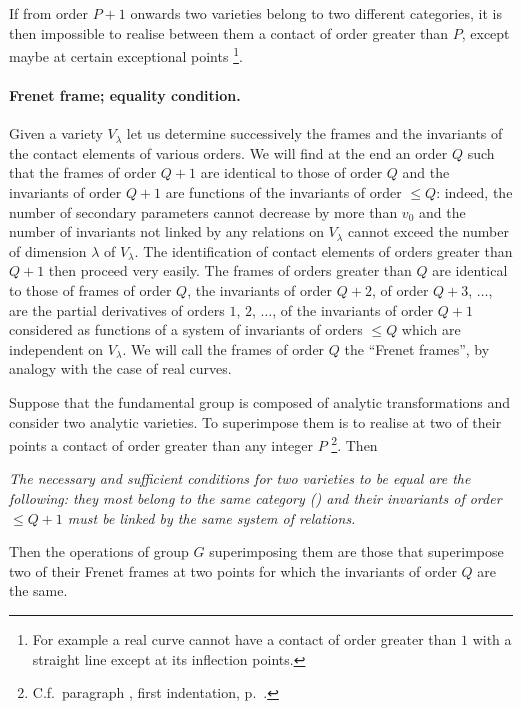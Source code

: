 If from order $P+1$ onwards two varieties belong to two different categories, it is then impossible to realise between them a contact of order greater than $P$, except maybe at certain exceptional points \footnote{For example a real curve cannot have a contact of order greater than $1$ with a straight line except at its inflection points.}.

\paragraph{Frenet frame; equality condition.}
\label{sec:131}
Given a variety $V_{\lambda}$ let us determine successively the frames and the invariants of the contact elements of various orders. We will find at the end an order $Q$ such that the frames of order $Q+1$ are identical to those of order $Q$ and the invariants of order $Q+1$ are functions of the invariants of order $\le Q$: indeed, the number of secondary parameters cannot decrease by more than $v_{0}$ and the number of invariants not linked by any relations on $V_{\lambda}$ cannot exceed the number of dimension $\lambda$ of $V_{\lambda}$. The identification of contact elements of orders greater than $Q+1$ then proceed very easily. The frames of orders greater than $Q$ are identical to those of frames of order $Q$, the invariants of order $Q+2$, of order $Q+3$, $\dots$, are the partial derivatives of orders $1$, $2$, $\dots$, of the invariants of order $Q+1$ considered as functions of a system of invariants of orders $\le Q$ which are independent on $V_{\lambda}$. We will call the frames of order $Q$ the ``Frenet frames'', by analogy with the case of real curves.

Suppose that the fundamental group is composed of analytic transformations and consider two analytic varieties. To superimpose them is to realise at two of their points a contact of order greater than any integer $P$ \footnote{C.f.~paragraph , first indentation, p.~\pageref{sec:13}.}. Then

\somespace

\emph{The necessary and sufficient conditions for two varieties to be equal are the following: they most belong to the same category \emph{()} and their invariants of order $\le Q+1$ must be linked by the same system of relations.}

\somespace

Then the operations of group $G$ superimposing them are those that superimpose two of their Frenet frames at two points for which the invariants of order $Q$ are the same.

